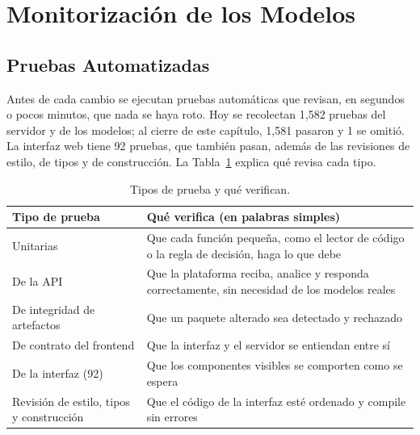\section{Monitorización de los Modelos}
\label{sec:monitorizacion_modelos}

\subsection{Pruebas Automatizadas}
\label{subsec:pruebas}

Antes de cada cambio se ejecutan pruebas automáticas que revisan, en segundos o pocos minutos, que nada se haya roto. Hoy se recolectan 1,582 pruebas del servidor y de los modelos; al cierre de este capítulo, 1,581 pasaron y 1 se omitió. La interfaz web tiene 92 pruebas, que también pasan, además de las revisiones de estilo, de tipos y de construcción. La Tabla~\ref{tab:pruebas} explica qué revisa cada tipo.

\begin{table}[H]
    \centering
    \caption{Tipos de prueba y qué verifican.}
    \label{tab:pruebas}
    \renewcommand{\arraystretch}{1.25}
    \small
    \begin{tabularx}{\textwidth}{|>{\raggedright\arraybackslash}p{4.4cm}|X|}
        \hline
        \textbf{Tipo de prueba} & \textbf{Qué verifica (en palabras simples)} \\ \hline
        Unitarias & Que cada función pequeña, como el lector de código o la regla de decisión, haga lo que debe \\ \hline
        De la API & Que la plataforma reciba, analice y responda correctamente, sin necesidad de los modelos reales \\ \hline
        De integridad de artefactos & Que un paquete alterado sea detectado y rechazado \\ \hline
        De contrato del frontend & Que la interfaz y el servidor se entiendan entre sí \\ \hline
        De la interfaz (92) & Que los componentes visibles se comporten como se espera \\ \hline
        Revisión de estilo, tipos y construcción & Que el código de la interfaz esté ordenado y compile sin errores \\ \hline
    \end{tabularx}
\end{table}

